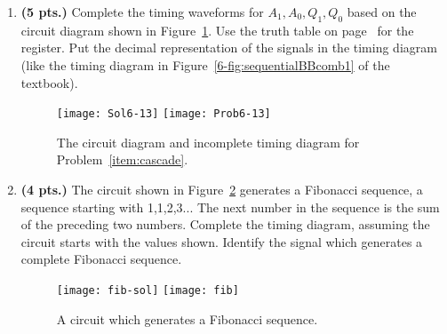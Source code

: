 \begin{enumerate}
    \item\textbf{ (5 pts.)} Complete the timing waveforms for $A_1, A_0, Q_1, Q_0$
        \label{item:cascade}
        based on the circuit diagram shown in Figure~\ref{fig:cascade}.  Use the truth
        table on page~\pageref{6-page:reg} for the register. Put the decimal
        representation of the signals in the timing diagram (like the timing
        diagram in Figure~\ref{6-fig:sequentialBBcomb1} of the textbook).\needspace{2.2in}
        \begin{figure}[ht]
            \ifshowanswers \texttt{[image: Sol6-13]}
            \else \texttt{[image: Prob6-13]} \fi
            \caption{The circuit diagram and incomplete timing diagram for
            Problem~\ref{item:cascade}.}
            \label{fig:cascade}
        \end{figure}

        \needspace{2in}
    \item\textbf{ (4 pts.)} The circuit shown in Figure~\ref{fig:fib} generates a
        Fibonacci sequence, a sequence starting with 1,1,2,3...  The next number in
        the sequence is the sum of the preceding two numbers.  Complete the
        timing diagram, assuming the circuit starts with the values shown.
        Identify the signal which generates a complete Fibonacci sequence.

        \begin{figure}[ht]
            \ifshowanswers \texttt{[image: fib-sol]}
            \else \texttt{[image: fib]} \fi
            \caption{A circuit which generates a Fibonacci sequence.}
            \label{fig:fib}
        \end{figure}

\end{enumerate}
